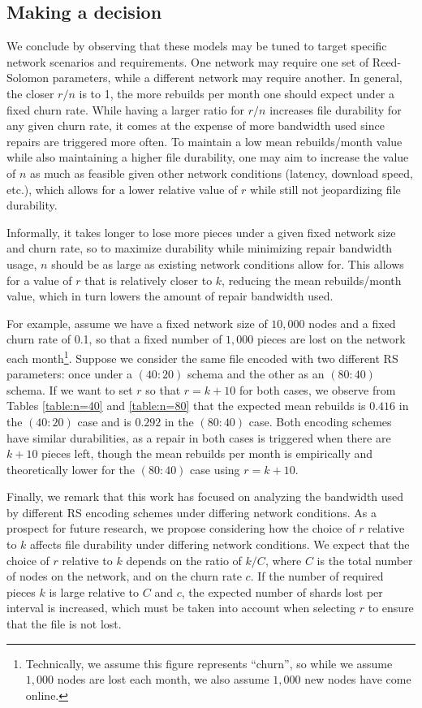 \subsection{Making a decision}

We conclude by observing that these models may be tuned to target specific network scenarios and requirements. One network may require one set of Reed-Solomon parameters, while a different network may require another. In general, the closer $r/n$ is to 1, the more rebuilds per month one should expect under a fixed churn rate. While having a larger ratio for $r/n$ increases file durability for any given churn rate, it comes at the expense of more bandwidth used since repairs are triggered more often. To maintain a low mean rebuilds/month value while also maintaining a higher file durability, one may aim to increase the value of $n$ as much as feasible given other network conditions (latency, download speed, etc.), which allows for a lower relative value of $r$ while still not jeopardizing file durability. 

Informally, it takes longer to lose more pieces under a given fixed network size and churn rate, so to maximize durability while minimizing repair bandwidth usage, $n$ should be as large as existing network conditions allow for. This allows for a value of $r$ that is relatively closer to $k$, reducing the mean rebuilds/month value, which in turn lowers the amount of repair bandwidth used. 

For example, assume we have a fixed network size of $10,000$ nodes and a fixed churn rate of 0.1, so that a fixed number of $1,000$ pieces are lost on the network each month\footnote{
Technically, we assume this figure represents ``churn'', so while we assume $1,000$ nodes are lost each month, we also assume $1,000$ new nodes have come online.
}. 
Suppose we consider the same file encoded with two different RS parameters: once under a $(40:20)$ schema and the other as an $(80:40)$ schema. If we want to set $r$ so that $r=k+10$ for both cases, we observe from Tables \ref{table:n=40} and \ref{table:n=80} that the expected mean rebuilds is $0.416$ in the $(40:20)$ case and is $0.292$ in the $(80:40)$ case. Both encoding schemes have similar durabilities, as a repair in both cases is triggered when there are $k+10$ pieces left, though the mean rebuilds per month is empirically and theoretically lower for the $(80:40)$ case using $r=k+10$. 

Finally, we remark that this work has focused on analyzing the bandwidth used by different RS encoding schemes under differing network conditions. As a prospect for future research, we propose considering how the choice of $r$ relative to $k$ affects file durability under differing network conditions. We expect that the choice of $r$ relative to $k$ depends on the ratio of $k/C$, where $C$ is the total number of nodes on the network, and on the churn rate $c$. If the number of required pieces $k$ is large relative to $C$ and $c$, the expected number of shards lost per interval is increased, which must be taken into account when selecting $r$ to ensure that the file is not lost.